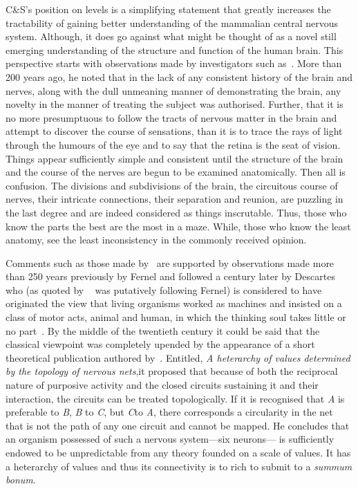 \documentclass[11pt,3p,twocolumn]{JMN}
\begin{document}
C\&S's position on levels is a simplifying statement that greatly increases the tractability of gaining better understanding of the mammalian central nervous system. Although, it does go against what might be thought of as a novel still emerging understanding of the structure and function of the human brain. This perspective starts with observations made by investigators such as~\citet{bell11}. More than 200 years ago, he noted that in the lack of any consistent history of the brain and nerves, along with the dull unmeaning manner of demonstrating the brain, any novelty in the manner of treating the subject was authorised. Further, that it is no more presumptuous to follow the tracts of nervous matter in the brain and attempt to discover the course of sensations, than it is to trace the rays of light through the humours of the eye and to say that the retina is the seat of vision. Things appear sufficiently simple and consistent until the structure of the brain and the course of the nerves are begun to be examined anatomically. Then all is confusion. The divisions and subdivisions of the brain, the circuitous course of nerves, their intricate connections, their separation and reunion, are puzzling in the last degree and are indeed considered as things inscrutable. Thus, those who know the parts the best are the most in a maze. While, those who know the least anatomy, see the least inconsistency in the commonly received opinion.

Comments such as those made by~\citet{bell11} are supported by observations made more than 250 years previously by Fernel and followed a century later by Descartes who (as quoted by \citeauthor{sherrington53}~\citeyear{sherrington53} was putatively following Fernel) is considered to have originated the view that living organisms worked as machines and insisted on a class of motor acts, animal and human, in which the thinking soul takes little or no part~\citep{descartes62}.
By the middle of the twentieth century it could be said that the classical viewpoint was completely upended by the appearance of a short theoretical publication authored by~\citet{mcculloch45}. Entitled, {\it{A heterarchy of values determined by the topology of nervous nets}},it proposed that because of both the reciprocal nature of purposive activity and the closed circuits sustaining it and their interaction, the circuits can be treated topologically. If it is recognised that {\it{A}} is preferable to {\it{B}}, {\it{B}} to {\it{C}}, but {\it{C}}to {\it{A}}, there corresponds a circularity in the net that is not the path of any one circuit and cannot be mapped. He concludes that an organism possessed of such a nervous system---six neurons--- is sufficiently endowed to be unpredictable from any theory founded on a scale of values. It has a heterarchy of values and thus its connectivity is to rich to submit to a {\it{summum bonum}}.
\end{document}

